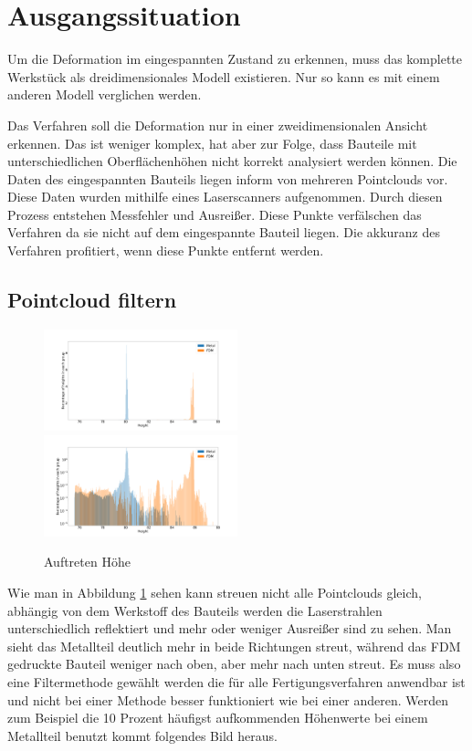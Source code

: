 \documentclass[../main.tex]{subfiles}
\begin{document}
\section{Ausgangssituation}

Um die Deformation im eingespannten Zustand zu erkennen, muss das komplette Werkstück
als dreidimensionales Modell existieren. Nur so kann es mit einem anderen Modell 
verglichen werden.

Das Verfahren soll die Deformation nur in einer zweidimensionalen Ansicht erkennen. 
Das ist weniger komplex, hat aber zur Folge, dass Bauteile mit unterschiedlichen 
Oberflächenhöhen nicht korrekt analysiert werden können. 
Die Daten des eingespannten Bauteils liegen inform von mehreren Pointclouds vor.
Diese Daten wurden mithilfe eines Laserscanners aufgenommen. Durch diesen Prozess 
entstehen Messfehler und Ausreißer. Diese Punkte verfälschen das Verfahren da sie 
nicht auf dem eingespannte Bauteil liegen. Die akkuranz des Verfahren profitiert, 
wenn diese Punkte entfernt werden.

\subsection{Pointcloud filtern}

\begin{figure}
    \centering
    \includegraphics[width=0.5\textwidth]{images/height_occurange.png}
    \includegraphics[width=0.5\textwidth]{images/height_occurange_log.png}
    \caption{Auftreten Höhe}
    \label{fig:brightness}
\end{figure}

Wie man in Abbildung \ref{fig:brightness} sehen kann streuen nicht alle Pointclouds 
gleich, abhängig von dem Werkstoff des Bauteils werden die Laserstrahlen unterschiedlich
reflektiert und mehr oder weniger Ausreißer sind zu sehen. 
Man sieht das Metallteil deutlich mehr in beide Richtungen 
streut, während das FDM gedruckte Bauteil weniger nach oben, aber mehr nach unten 
streut. Es muss also eine Filtermethode gewählt werden die für alle Fertigungsverfahren
anwendbar ist und nicht bei einer Methode besser funktioniert wie bei einer 
anderen. Werden zum Beispiel die 10 Prozent häufigst aufkommenden Höhenwerte bei einem
Metallteil benutzt kommt folgendes Bild heraus.
\end{document}
